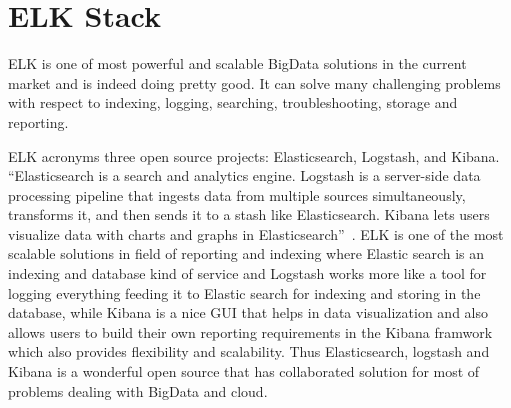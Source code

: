 \section{ELK Stack}

ELK is one of most powerful and scalable BigData solutions in the current
market and is indeed doing pretty good. It can solve many challenging 
problems with respect to indexing, logging, searching, troubleshooting,
storage and reporting.

ELK acronyms three open source projects: Elasticsearch, Logstash, 
and Kibana. ``Elasticsearch is a search and analytics engine. Logstash is a 
server-side data processing pipeline that ingests data from multiple sources 
simultaneously, transforms it, and then sends it to a stash like 
Elasticsearch. Kibana lets users visualize data with charts and graphs in 
Elasticsearch''~\cite{hid-sp18-410-ELKBlog}. ELK is one of the most scalable solutions in
field of reporting and indexing where Elastic search is an indexing and
database kind of service and Logstash works more like a tool for logging
everything feeding it to Elastic search for indexing and storing in 
the database, while Kibana is a nice GUI that helps in data visualization
and also allows users to build their own reporting requirements in the
Kibana framwork which also provides flexibility and scalability.
Thus Elasticsearch, logstash and Kibana is a wonderful open source that
has collaborated solution for most of problems dealing with BigData 
and cloud.

